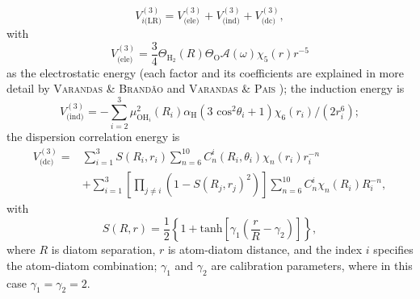 \documentclass[12pt]{article}
\begin{document}
\begin{equation}
    V^{(3)}_{i\text{(LR)}} = V^{(3)}_{\text{(ele)}} + V^{(3)}_{\text{(ind)}} + V^{(3)}_{\text{(dc)}},
\label{eqehflr}
\end{equation}
with 
\begin{equation}
    V^{(3)}_{\text{(ele)}} = \frac{3}{4}\Theta_{\text{H}_2}(R)\Theta_{\text{O}}\mathcal{A}(\omega)\chi_5(r)r^{-5}
\label{eqehfele}
\end{equation}
as the electrostatic energy (each factor and its coefficients are explained in more detail by \textsc{Varandas \& Brandão} \cite{idx169} and \textsc{Varandas \& Pais} \cite{idx170}); the induction energy is
\begin{equation}
    V^{(3)}_{\text{(ind)}} = -\sum^3_{i=2}\mu^2_{\text{OH}_i}(R_i)\alpha_\text{H}(3\text{ cos}^2\theta_i+1)\chi_6(r_i)/(2r_i^6);
\label{eqehfind}
\end{equation}
the dispersion correlation energy is
\begin{equation}
    \begin{split}
        V^{(3)}_{\text{(dc)}} = &\sum^3_{i=1}S(R_i,r_i)\sum^{10}_{n=6}C^i_n(R_i,\theta_i)\chi_n(r_i)r_i^{-n} \\ &+ \sum^3_{i=1}\left[\prod_{j\neq i}(1-S(R_j,r_j)^2)\right]\sum^{10}_{n=6}C^i_n\chi_n(R_i)R_i^{-n},
    \end{split}
    \label{eqehfdc}
\end{equation}
with
\begin{equation}
    S(R,r) = \frac{1}{2}\left\{1+\text{tanh}\left[\gamma_1\left(\frac{r}{R}-\gamma_2\right)\right]\right\},
\end{equation}
where $R$ is diatom separation, $r$ is atom-diatom distance, and the index $i$ specifies the atom-diatom combination; $\gamma_1$ and $\gamma_2$ are calibration parameters, where in this case $\gamma_1 = \gamma_2=2$.
\end{document}

